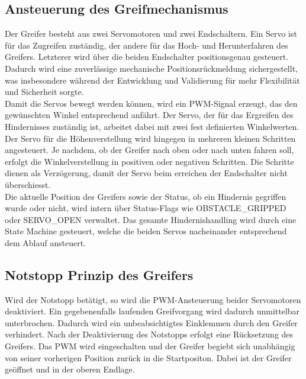 \documentclass[main.tex]{subfiles} %
\begin{document}
\subsection{Ansteuerung des Greifmechanismus}
Der Greifer besteht aus zwei Servomotoren und zwei Endschaltern. Ein Servo ist für das Zugreifen zuständig,
der andere für das Hoch- und Herunterfahren des Greifers. Letzterer wird über die beiden Endschalter
positionsgenau gesteuert. Dadurch wird eine zuverlässige mechanische Positionsrückmeldung sichergestellt,
was insbesondere während der Entwicklung und Validierung für mehr Flexibilität und Sicherheit sorgte.\\
Damit die Servos bewegt werden können, wird ein PWM-Signal erzeugt, das den
gewünschten Winkel entsprechend anfährt. Der Servo, der für das Ergreifen des Hindernisses zuständig ist,
arbeitet dabei mit zwei fest definierten Winkelwerten. Der Servo für die Höhenverstellung wird hingegen in
mehreren kleinen Schritten angesteuert. Je nachdem, ob der Greifer nach oben oder nach unten fahren soll,
erfolgt die Winkelverstellung in positiven oder negativen Schritten. Die Schritte dienen als Verzögerung,
damit der Servo beim erreichen der Endschalter nicht überschiesst.\\
Die aktuelle Position des Greifers sowie der Status, ob ein Hindernis gegriffen wurde oder nicht, wird intern
über Status-Flags wie OBSTACLE\_GRIPPED oder SERVO\_OPEN verwaltet. Das gesamte Hindernishandling wird durch
eine State Machine gesteuert, welche die beiden Servos nacheinander entsprechend dem Ablauf ansteuert.

\subsection{Notstopp Prinzip des Greifers}
Wird der Notstopp betätigt, so wird die PWM-Ansteuerung beider Servomotoren deaktiviert. Ein gegebenenfalls laufenden Greifvorgang
wird dadurch unmittelbar unterbrochen. Dadurch wird ein unbeabsichtigtes Einklemmen durch den Greifer verhindert.
Nach der Deaktivierung des Notstopps erfolgt eine Rücksetzung des Greifers. Das PWM wird eingeschalten und der Greifer begiebt sich
unabhängig von seiner vorherigen Position zurück in die Startpositon. Dabei ist der Greifer geöffnet und in der oberen Endlage.
\end{document}
